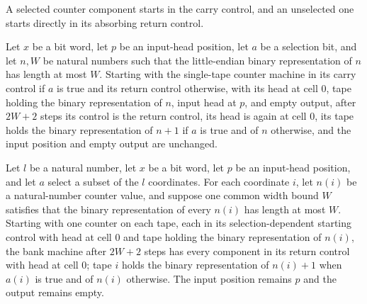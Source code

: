 \begin{definition}
\label{Complexity.clBankStart}
\leanok
A selected counter component starts in the carry control, and an unselected one starts directly in its absorbing return control.
\end{definition}

\begin{lemma}
\label{Complexity.clBank_component}
\leanok
{}
Let $x$ be a bit word, let $p$ be an input-head position, let $a$ be a selection bit,
and let $n,W$ be natural numbers such that the little-endian binary representation of
$n$ has length at most $W$. Starting with the single-tape counter machine in its carry
control if $a$ is true and its return control otherwise, with its head at cell $0$, tape
holding the binary representation of $n$, input head at $p$, and empty output, after
$2W+2$ steps its control is the return control, its head is again at cell $0$, its tape
holds the binary representation of $n+1$ if $a$ is true and of $n$ otherwise, and the
input position and empty output are unchanged.
\end{lemma}

\begin{lemma}
\label{Complexity.clBank_finish}
\leanok
{}
Let $l$ be a natural number, let $x$ be a bit word, let $p$ be an input-head position,
and let $a$ select a subset of the $l$ coordinates. For each coordinate $i$, let $n(i)$
be a natural-number counter value, and suppose one common width bound $W$ satisfies that
the binary representation of every $n(i)$ has length at most $W$. Starting with one
counter on each tape, each in its selection-dependent starting control with head at cell
$0$ and tape holding the binary representation of $n(i)$, the bank machine after $2W+2$
steps has every component in its return control with head at cell $0$; tape $i$ holds
the binary representation of $n(i)+1$ when $a(i)$ is true and of $n(i)$ otherwise. The
input position remains $p$ and the output remains empty.
\end{lemma}

